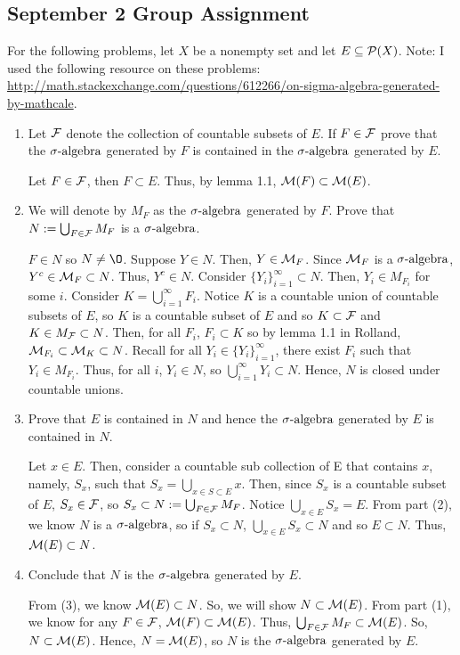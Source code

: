 \subsection{September 2 Group Assignment}

For the following problems, let $X$ be a nonempty set and let $E\subseteq {\mathcal P} (X)$. Note: I used the following resource on these problems: \url{http://math.stackexchange.com/questions/612266/on-sigma-algebra-generated-by-mathcale}. 

\begin{enumerate}
\item Let ${\mathcal F}$ denote the collection of countable subsets of $E$. If $F \in {\mathcal F}$ prove that the ${\sigma}\text{-algebra}$ generated by $F$ is contained in the ${\sigma}\text{-algebra}$ generated by $E$.

\begin{pf}
Let $F \in {\mathcal F}$, then $F \subset E$. Thus, by lemma 1.1,  ${\mathcal M}(F) \subset {\mathcal M}(E)$.   
\end{pf}

\item We will denote by $M_F$ as the ${\sigma}\text{-algebra}$ generated by $F$. Prove that $N:= \bigcup_{F\in{\mathcal F}}M_F$ is a ${\sigma}\text{-algebra}$.
\begin{pf}
$F \in N$ so $N \neq \O$. Suppose $Y \in N$. Then, $Y \in {\mathcal M}_F$. Since ${\mathcal M}_F$ is a ${\sigma}\text{-algebra}$, $Y^c \in {\mathcal M}_F \subset N$. Thus, $Y^c \in N$. Consider $\{ {Y_i} \}_{i=1}^\infty \subset N$. Then, $Y_i \in M_{F_i}$ for some $i$. Consider $K = \bigcup_{i=1}^\infty F_i$. Notice $K$ is a countable union of countable subsets of $E$, so $K$ is a countable subset of $E$ and so $K \subset {\mathcal F}$ and $K \in M_{\mathcal F} \subset N$.  Then, for all $F_i$, $F_i \subset K$ so by lemma 1.1 in Rolland, ${\mathcal M}_{F_i} \subset {\mathcal M}_K \subset N$. Recall for all $Y_i \in \{ Y_i \}_{i=1}^\infty$, there exist $F_i$ such that $Y_i \in M_{F_i}$. Thus, for all $i$, $Y_i \in N$, so $\bigcup_{i=1}^\infty Y_i \subset N$. Hence, $N$ is closed under countable unions.  \end{pf}

\item Prove that $E$ is contained in $N$ and hence the ${\sigma}\text{-algebra}$ generated by $E$ is contained in $N$.
\begin{pf}
 Let $x \in E$. Then, consider a countable sub collection of E that contains $x$, namely, $S_x$, such that $S_x = \bigcup_{x\in S \subset E}x$. Then, since $S_x$ is a countable subset of $E$, $S_x \in {\mathcal F}$, so $S_x \subset N:= \bigcup_{F\in{\mathcal F}}M_F$.   Notice $\bigcup_{x \in E} S_x=E$. From part (2), we know $N$ is a ${\sigma}\text{-algebra}$, so if  $S_x \subset N$, $\bigcup_{x \in E} S_x \subset N$ and so $E \subset N$. Thus, ${\mathcal M}(E)\subset N$.
\end{pf}

\item Conclude that $N$ is the ${\sigma}\text{-algebra}$ generated by $E$.
\begin{pf}
 From (3), we know ${\mathcal M}(E)\subset N$. So, we will show $N \subset {\mathcal M}(E)$. From part (1), we know for any $F \in {\mathcal F}$, ${\mathcal M}(F) \subset {\mathcal M}(E)$. Thus, $\bigcup_{F\in{\mathcal F}}M_F \subset {\mathcal M}(E)$. So, $N \subset {\mathcal M}(E)$. Hence, $N = {\mathcal M}(E)$, so $N$ is the ${\sigma}\text{-algebra}$ generated by $E$. 
\end{pf}

\end{enumerate}




 